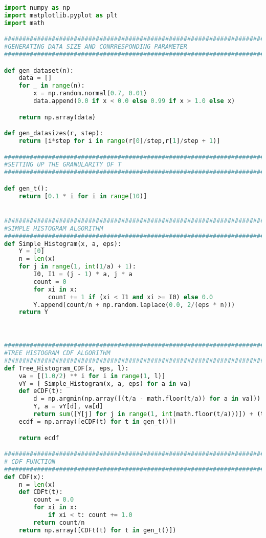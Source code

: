 \begin{lstlisting}[label=code-alg3, language=Python, caption=Python Code For Algorithm 2 Tree Histogram CDF]
import numpy as np
import matplotlib.pyplot as plt
import math

#############################################################################
#GENERATING DATA SIZE AND CONRRESPONDING PARAMETER
#############################################################################

def gen_dataset(n):
	data = []
	for _ in range(n):
		x = np.random.normal(0.7, 0.01)
		data.append(0.0 if x < 0.0 else 0.99 if x > 1.0 else x)

	return np.array(data)

def gen_datasizes(r, step):
	return [i*step for i in range(r[0]/step,r[1]/step + 1)]

#############################################################################
#SETTING UP THE GRANULARITY OF T
#############################################################################

def gen_t():
	return [0.1 * i for i in range(10)]


#############################################################################
#SIMPLE HISTOGRAM ALGORITHM
#############################################################################
def Simple_Histogram(x, a, eps):
	Y = [0]
	n = len(x)
	for j in range(1, int(1/a) + 1):
		I0, I1 = (j - 1) * a, j * a
		count = 0
		for xi in x:
			count += 1 if (xi < I1 and xi >= I0) else 0.0
		Y.append(count/n + np.random.laplace(0.0, 2/(eps * n)))
	return Y



#############################################################################
#TREE HISTOGRAM CDF ALGORITHM
#############################################################################
def Tree_Histogram_CDF(x, eps, l):
	va = [(1.0/2) ** i for i in range(1, l)]
	vY = [ Simple_Histogram(x, a, eps) for a in va]
	def eCDF(t):
		d = np.argmin(np.array([(t/a - math.floor(t/a)) for a in va]))
		Y, a = vY[d], va[d]
		return sum([Y[j] for j in range(1, int(math.floor(t/a)))]) + (t/a - math.floor(t/a)) * Y[int(math.floor(t/a)) + 1]
	ecdf = np.array([eCDF(t) for t in gen_t()])

	return ecdf

#############################################################################
# CDF FUNCTION
#############################################################################
def CDF(x):
	n = len(x)
	def CDFt(t):
		count = 0.0
		for xi in x:
			if xi < t: count += 1.0
		return count/n
	return np.array([CDFt(t) for t in gen_t()])



\end{lstlisting}
